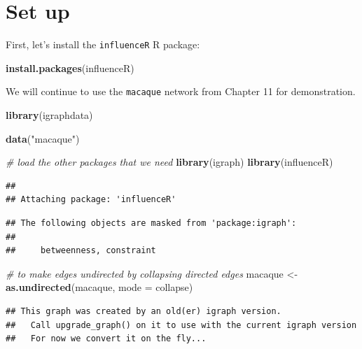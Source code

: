 \documentclass[
]{book}
\newenvironment{Shaded}{\begin{snugshade}}{\end{snugshade}}
\newcommand{\AttributeTok}[1]{\textcolor[rgb]{0.13,0.29,0.53}{#1}}
\newcommand{\CommentTok}[1]{\textcolor[rgb]{0.56,0.35,0.01}{\textit{#1}}}
\newcommand{\FunctionTok}[1]{\textcolor[rgb]{0.13,0.29,0.53}{\textbf{#1}}}
\newcommand{\NormalTok}[1]{#1}
\newcommand{\OtherTok}[1]{\textcolor[rgb]{0.56,0.35,0.01}{#1}}
\newcommand{\StringTok}[1]{\textcolor[rgb]{0.31,0.60,0.02}{#1}}
\begin{document}
\section{Set up}\label{set-up-2}

First, let's install the \texttt{influenceR} R package:

\begin{Shaded}
\begin{Highlighting}[]
\FunctionTok{install.packages}\NormalTok{(}\StringTok{\textquotesingle{}influenceR\textquotesingle{}}\NormalTok{)}
\end{Highlighting}
\end{Shaded}

We will continue to use the \texttt{macaque} network from Chapter 11 for demonstration.

\begin{Shaded}
\begin{Highlighting}[]
\FunctionTok{library}\NormalTok{(igraphdata)}

\FunctionTok{data}\NormalTok{(}\StringTok{"macaque"}\NormalTok{)}

\CommentTok{\# load the other packages that we need }
\FunctionTok{library}\NormalTok{(igraph)}
\FunctionTok{library}\NormalTok{(influenceR)}
\end{Highlighting}
\end{Shaded}

\begin{verbatim}
## 
## Attaching package: 'influenceR'
\end{verbatim}

\begin{verbatim}
## The following objects are masked from 'package:igraph':
## 
##     betweenness, constraint
\end{verbatim}

\begin{Shaded}
\begin{Highlighting}[]
\CommentTok{\# to make edges undirected by collapsing directed edges }
\NormalTok{macaque }\OtherTok{\textless{}{-}} \FunctionTok{as.undirected}\NormalTok{(macaque, }\AttributeTok{mode =} \StringTok{\textquotesingle{}collapse\textquotesingle{}}\NormalTok{)}
\end{Highlighting}
\end{Shaded}

\begin{verbatim}
## This graph was created by an old(er) igraph version.
##   Call upgrade_graph() on it to use with the current igraph version
##   For now we convert it on the fly...
\end{verbatim}
\end{document}
